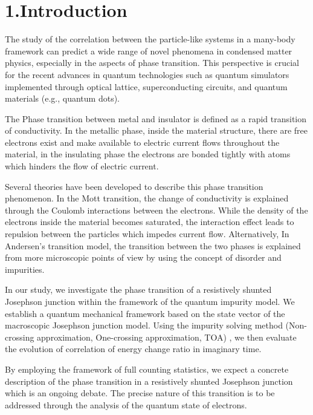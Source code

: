\documentclass{article}[12pt]
\begin{document}
\section*{1.Introduction}
\begin{spacing}{1.5}

The study of the correlation between the particle-like systems in a many-body framework can predict a wide range of novel phenomena in condensed matter physics, especially in the aspects of phase transition. 
This perspective is crucial for the recent advances in quantum technologies such as quantum simulators implemented through optical lattice, superconducting circuits, and quantum materials (e.g., quantum dots).

The Phase transition between metal and insulator is defined as a rapid transition of conductivity. In the metallic phase, inside the material structure, there are free electrons exist and make available to electric current flows throughout the material, in the insulating phase the electrons are bonded tightly with atoms which hinders the flow of electric current.

Several theories have been developed to describe this phase transition phenomenon. In the Mott transition, the change of conductivity is explained through the Coulomb interactions between the electrons. While the density of the electrons inside the material becomes saturated, the interaction effect leads to repulsion between the particles which impedes current flow. Alternatively, In Andersen's transition model, the transition between the two phases is explained from more microscopic points of view by using the concept of disorder and impurities.

In our study, we investigate the phase transition of a resistively shunted Josephson junction within the framework of the quantum impurity model. We establish a quantum mechanical framework based on the state vector of the macroscopic Josephson junction model. Using the impurity solving method (Non-crossing approximation, One-crossing approximation, TOA) , we then evaluate the evolution of correlation of energy change ratio in imaginary time.

By employing the framework of full counting statistics, we expect a concrete description of the phase transition in a resistively shunted Josephson junction which is an ongoing debate. The precise nature of this transition is to be addressed through the analysis of the quantum state of electrons.
\end{spacing}
\end{document}
